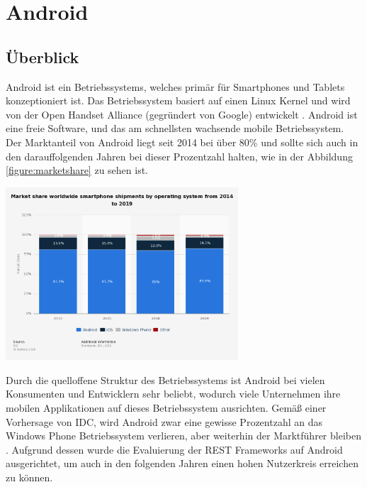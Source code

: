 \chapter{Android}
\label{sec:android}

\section{Überblick}
Android ist ein Betriebssystems, welches primär für Smartphones und Tablets konzeptioniert ist. Das Betriebssystem basiert auf einen Linux Kernel und wird von der Open Handset Alliance (gegründert von Google) entwickelt \cite{overviewAndroid:singh}. Android ist eine freie Software, und das am schnellsten wachsende mobile Betriebssystem. Der Marktanteil von Android liegt seit 2014 bei über 80\% und sollte sich auch in den darauffolgenden Jahren bei dieser Prozentzahl halten, wie in der Abbildung \ref{figure:marketshare} zu sehen ist. \\
 
\begin{minipage}{\textwidth} 
	\centering	
	\includegraphics[width=0.65\textwidth]{figures/smartphone-os-market-share.png}
	\label{figure:marketshare}
	\vspace{2ex}
\end{minipage}

Durch die quelloffene Struktur des Betriebssystems ist Android bei vielen Konsumenten und Entwicklern sehr beliebt, wodurch viele Unternehmen ihre mobilen Applikationen auf dieses Betriebssystem ausrichten. Gemäß einer Vorhersage von IDC, wird Android zwar eine gewisse Prozentzahl an das Windows Phone Betriebssystem verlieren, aber weiterhin der Marktführer bleiben \cite{statsticMobileOS}. Aufgrund dessen wurde die Evaluierung der REST Frameworks auf Android ausgerichtet, um auch in den folgenden Jahren einen hohen Nutzerkreis erreichen zu können.

